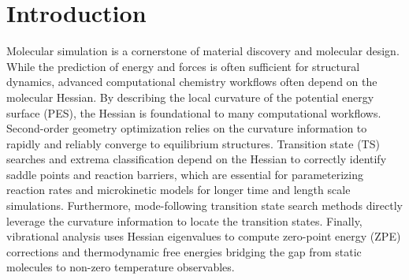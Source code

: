\documentclass[pdflatex,sn-mathphys-num]{sn-jnl}%
\begin{document}



\maketitle

\section{Introduction}\label{sec1}

Molecular simulation is a cornerstone of material discovery and molecular design. While the prediction of energy and forces is often sufficient for structural dynamics, advanced computational chemistry workflows often depend on the molecular Hessian\citep{qu2016,huang2018}. By describing the local curvature of the potential energy surface (PES), the Hessian is foundational to many computational workflows. Second-order geometry optimization relies on the curvature information to rapidly and reliably converge to equilibrium structures\cite{schlegel2011}. Transition state (TS) searches and extrema classification depend on the Hessian to correctly identify saddle points and reaction barriers, which are essential for parameterizing reaction rates and microkinetic models for longer time and length scale simulations\cite{andersen2019}. Furthermore, mode-following transition state search methods directly leverage the curvature information to locate the transition states\cite{henkelman1999}. Finally, vibrational analysis uses Hessian eigenvalues to compute zero-point energy (ZPE) corrections and thermodynamic free energies bridging the gap from static molecules to non-zero temperature observables\cite{grimme2012}. 
\end{document}
